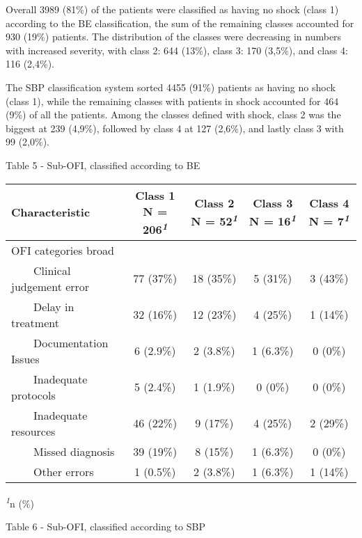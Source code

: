 \documentclass[
]{article}
\begin{document}
Overall 3989 (81\%) of the patients were classified as having no shock
(class 1) according to the BE classification, the sum of the remaining
classes accounted for 930 (19\%) patients. The distribution of the
classes were decreasing in numbers with increased severity, with class
2: 644 (13\%), class 3: 170 (3,5\%), and class 4: 116 (2,4\%).

The SBP classification system sorted 4455 (91\%) patients as having no
shock (class 1), while the remaining classes with patients in shock
accounted for 464 (9\%) of all the patients. Among the classes defined
with shock, class 2 was the biggest at 239 (4,9\%), followed by class 4
at 127 (2,6\%), and lastly class 3 with 99 (2,0\%).

Table 5 - Sub-OFI, classified according to BE

\begin{table}[!t]
\fontsize{12.0pt}{14.4pt}\selectfont
\begin{tabular*}{\linewidth}{@{\extracolsep{\fill}}lcccc}
\toprule
\textbf{Characteristic} & \textbf{Class 1}  N = 206\textsuperscript{\textit{1}} & \textbf{Class 2}  N = 52\textsuperscript{\textit{1}} & \textbf{Class 3}  N = 16\textsuperscript{\textit{1}} & \textbf{Class 4}  N = 7\textsuperscript{\textit{1}} \\ 
\midrule\addlinespace[2.5pt]
OFI categories broad &  &  &  &  \\ 
    Clinical judgement error & 77 (37\%) & 18 (35\%) & 5 (31\%) & 3 (43\%) \\ 
    Delay in treatment & 32 (16\%) & 12 (23\%) & 4 (25\%) & 1 (14\%) \\ 
    Documentation Issues & 6 (2.9\%) & 2 (3.8\%) & 1 (6.3\%) & 0 (0\%) \\ 
    Inadequate protocols & 5 (2.4\%) & 1 (1.9\%) & 0 (0\%) & 0 (0\%) \\ 
    Inadequate resources & 46 (22\%) & 9 (17\%) & 4 (25\%) & 2 (29\%) \\ 
    Missed diagnosis & 39 (19\%) & 8 (15\%) & 1 (6.3\%) & 0 (0\%) \\ 
    Other errors & 1 (0.5\%) & 2 (3.8\%) & 1 (6.3\%) & 1 (14\%) \\ 
\bottomrule
\end{tabular*}
\begin{minipage}{\linewidth}
\textsuperscript{\textit{1}}n (\%)\\
\end{minipage}
\end{table}

Table 6 - Sub-OFI, classified according to SBP
\end{document}
